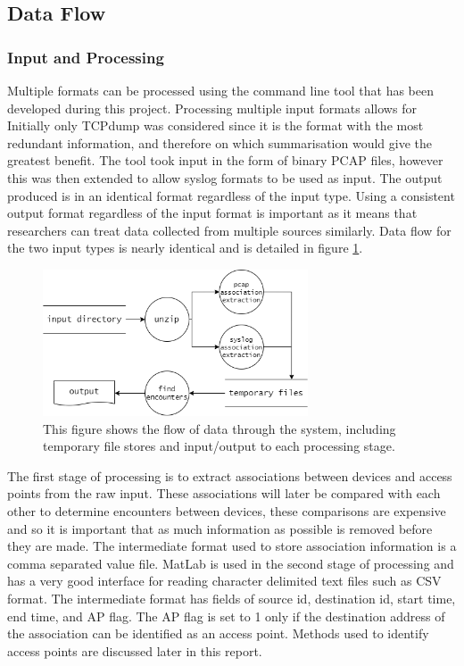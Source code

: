 \subsection{Data Flow}

\subsubsection{Input and Processing}
Multiple formats can be processed using the command line tool that has been developed during this project. Processing multiple input formats allows for  Initially only TCPdump was considered since it is the format with the most redundant information, and therefore on which summarisation would give the greatest benefit. The tool took input in the form of binary PCAP files, however this was then extended to allow syslog formats to be used as input. The output produced is in an identical format regardless of the input type. Using a consistent output format regardless of the input format is important as it means that researchers can treat data collected from multiple sources similarly. Data flow for the two input types is nearly identical and is detailed in figure \ref{fig:df_dia}.\newline
\begin{figure}[h]
    \centering
    \includegraphics[width=0.7\textwidth]{df_diagram.png}
    \caption{This figure shows the flow of data through the system, including temporary file stores and input/output to each processing stage.}
    \label{fig:df_dia}
\end{figure}

The first stage of processing is to extract associations between devices and access points from the raw input. These associations will later be compared with each other to determine encounters between devices, these comparisons are expensive and so it is important that as much information as possible is removed before they are made. The intermediate format used to store association information is  a comma separated value file. MatLab is used in the second stage of processing and has a very good interface for reading character delimited text files such as CSV format. The intermediate format has fields of source id, destination id, start time, end time, and AP flag. The AP flag is set to 1 only if the destination address of the association can be identified as an access point. Methods used to identify access points are discussed later in this report.

